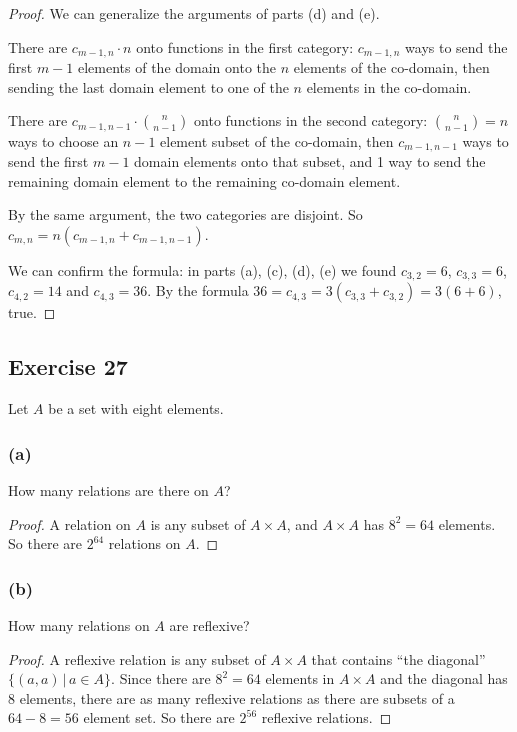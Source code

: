 \documentclass[14pt]{extarticle}
\begin{document}
\begin{proof}
We can generalize the arguments of parts (d) and (e). 

There are \(c_{m-1,n} \cdot n\) onto functions in the first category: \(c_{m-1,n}\) ways to send the first \(m-1\) 
elements of the domain onto the \(n\) elements of the co-domain, then sending the last domain element to one of the 
\(n\) elements in the co-domain.

There are \(c_{m-1,n-1} \cdot \binom{n}{n-1}\) onto functions in the second category: \(\binom{n}{n-1} = n\) ways to choose
an \(n-1\) element subset of the co-domain, then \(c_{m-1,n-1}\) ways to send the first \(m-1\) domain elements onto that
subset, and 1 way to send the remaining domain element to the remaining co-domain element.

By the same argument, the two categories are disjoint. So \(c_{m,n} = n(c_{m-1,n} + c_{m-1,n-1})\). 

We can confirm the formula: in parts (a), (c), (d), (e) we found \(c_{3,2} = 6\), \(c_{3,3} = 6\), \(c_{4,2} = 14\) and 
\(c_{4,3} = 36\). By the formula \(36 = c_{4,3} = 3(c_{3,3} + c_{3,2}) = 3(6+6)\), true.
\end{proof}

\subsection{Exercise 27}
Let \(A\) be a set with eight elements.

\subsubsection{(a)}
How many relations are there on \(A\)?

\begin{proof}
A relation on \(A\) is any subset of \(A \times A\), and \(A \times A\) has \(8^2 = 64\) elements. So there are \(2^{64}\) 
relations on \(A\).
\end{proof}

\subsubsection{(b)}
How many relations on \(A\) are reflexive?

\begin{proof}
A reflexive relation is any subset of \(A \times A\) that contains ``the diagonal'' \(\{(a,a) \,|\, a \in A\}\). Since
there are \(8^2 = 64\) elements in \(A \times A\) and the diagonal has 8 elements, there are as many reflexive relations
as there are subsets of a \(64-8 = 56\) element set. So there are \(2^{56}\) reflexive relations.
\end{proof}
\end{document}
